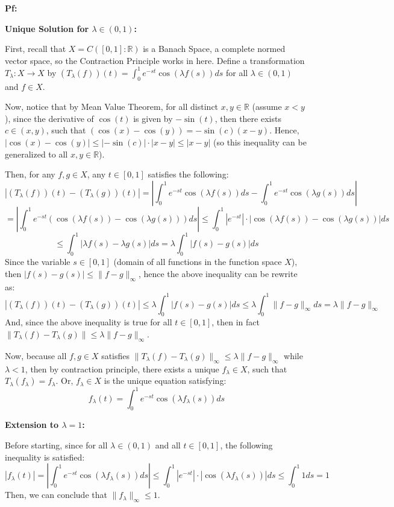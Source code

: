 \documentclass{article}
\begin{document}
\textbf{Pf:}

\textbf{Unique Solution for $\lambda\in (0,1)$:}

First, recall that $X=C([0,1]:\mathbb{R})$ is a Banach Space, a complete normed vector space, so the Contraction Principle works in here.
Define a transformation $T_\lambda:X\rightarrow X$ by $(T_\lambda(f))(t)=\int_{0}^{1}e^{-st}\cos(\lambda f(s))ds$ for all $\lambda\in (0,1)$ and $f\in X$.

Now, notice that by Mean Value Theorem, for all distinct $x,y\in\mathbb{R}$ (assume $x<y$), since the derivative of $\cos(t)$ is given by $-\sin(t)$,
then there exists $c\in (x,y)$, such that $(\cos(x)-\cos(y))=-\sin(c)(x-y)$. Hence, $|\cos(x)-\cos(y)|\leq |-\sin(c)|\cdot|x-y| \leq |x-y|$ (so this inequality can be generalized to all $x,y\in\mathbb{R}$).

Then, for any $f,g\in X$, any $t\in [0,1]$ satisfies the following:
$$|(T_\lambda(f))(t)-(T_\lambda(g))(t)| = \left|\int_{0}^{1}e^{-st}\cos(\lambda f(s))ds-\int_{0}^{1}e^{-st}\cos(\lambda g(s))ds\right|$$
$$ = \left|\int_{0}^{1}e^{-st}(\cos(\lambda f(s))-\cos(\lambda g(s)))ds\right| \leq \int_{0}^{1}|e^{-st}|\cdot |\cos(\lambda f(s))-\cos(\lambda g(s))|ds$$
$$\leq \int_{0}^{1}|\lambda f(s)-\lambda g(s)|ds = \lambda \int_{0}^{1}|f(s)-g(s)|ds$$
Since the variable $s\in [0,1]$ (domain of all functions in the function space $X$), then $|f(s)-g(s)| \leq \|f-g\|_\infty$, hence the above inequality can be rewrite as:
$$|(T_\lambda(f))(t)-(T_\lambda(g))(t)| \leq \lambda\int_{0}^{1}|f(s)-g(s)|ds \leq \lambda\int_{0}^{1}\|f-g\|_\infty ds = \lambda\|f-g\|_\infty$$
And, since the above inequality is true for all $t\in [0,1]$, then in fact $\|T_\lambda(f)-T_\lambda(g)\| \leq \lambda \|f-g\|_\infty$.

Now, because all $f,g\in X$ satisfies $\|T_\lambda(f)-T_\lambda(g)\|_\infty \leq \lambda\|f-g\|_\infty$ while $\lambda<1$, then by contraction principle, there exists a unique $f_\lambda \in X$,
such that $T_\lambda(f_\lambda)=f_\lambda$. Or, $f_\lambda\in X$ is the unique equation satisfying:
$$f_\lambda(t)=\int_{0}^{1}e^{-st}\cos(\lambda f_\lambda(s))ds$$

\hfil

\textbf{Extension to $\lambda=1$:}

Before starting, since for all $\lambda\in (0,1)$ and all $t\in [0,1]$, the following inequality is satisfied:
$$|f_\lambda(t)| = \left|\int_{0}^{1}e^{-st}\cos(\lambda f_\lambda(s))ds\right|\leq\int_{0}^{1}|e^{-st}|\cdot |\cos(\lambda f_\lambda(s))|ds \leq \int_{0}^{1}1 ds = 1$$
Then, we can conclude that $\|f_\lambda\|_\infty \leq 1$.
\end{document}
